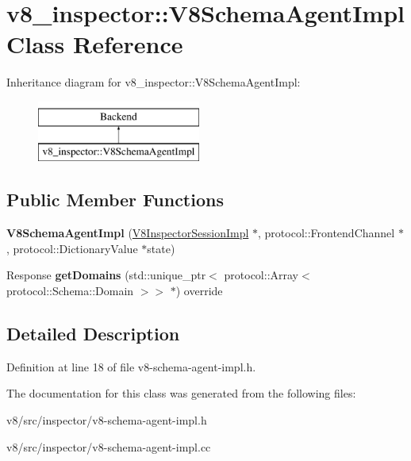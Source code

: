 \hypertarget{classv8__inspector_1_1V8SchemaAgentImpl}{}\section{v8\+\_\+inspector\+:\+:V8\+Schema\+Agent\+Impl Class Reference}
\label{classv8__inspector_1_1V8SchemaAgentImpl}
Inheritance diagram for v8\+\_\+inspector\+:\+:V8\+Schema\+Agent\+Impl\+:\begin{figure}[H]
\begin{center}
\leavevmode
\includegraphics[height=2.000000cm]{classv8__inspector_1_1V8SchemaAgentImpl}
\end{center}
\end{figure}
\subsection*{Public Member Functions}
\begin{DoxyCompactItemize}
\item 
\mbox{\label{classv8__inspector_1_1V8SchemaAgentImpl_a9d5b4b598e6f7979c0aa4ef00b3300ad}} 
{\bfseries V8\+Schema\+Agent\+Impl} (\mbox{\hyperlink{classv8__inspector_1_1V8InspectorSessionImpl}{V8\+Inspector\+Session\+Impl}} $\ast$, protocol\+::\+Frontend\+Channel $\ast$, protocol\+::\+Dictionary\+Value $\ast$state)
\item 
\mbox{\label{classv8__inspector_1_1V8SchemaAgentImpl_aa781434aad0c299c090762915f82e747}} 
Response {\bfseries get\+Domains} (std\+::unique\+\_\+ptr$<$ protocol\+::\+Array$<$ protocol\+::\+Schema\+::\+Domain $>$$>$ $\ast$) override
\end{DoxyCompactItemize}


\subsection{Detailed Description}


Definition at line 18 of file v8-\/schema-\/agent-\/impl.\+h.



The documentation for this class was generated from the following files\+:\begin{DoxyCompactItemize}
\item 
v8/src/inspector/v8-\/schema-\/agent-\/impl.\+h\item 
v8/src/inspector/v8-\/schema-\/agent-\/impl.\+cc\end{DoxyCompactItemize}
